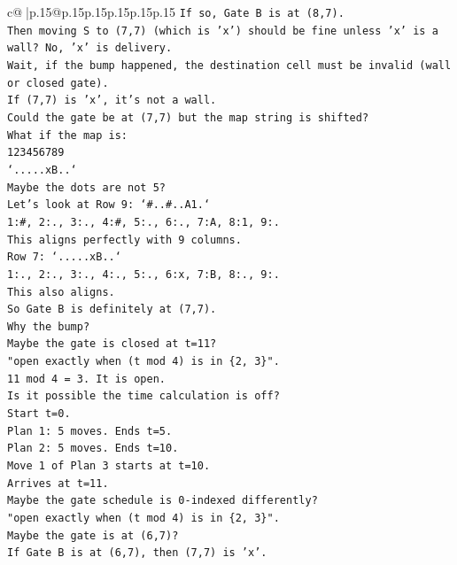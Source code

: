 \documentclass{article}
\begin{document}
{\begin{supertabular}{c@{$\;$}|p{.15\linewidth}@{}p{.15\linewidth}p{.15\linewidth}p{.15\linewidth}p{.15\linewidth}p{.15\linewidth}}
{{{\texttt{If so, Gate B is at (8,7).} \\
\texttt{Then moving S to (7,7) (which is 'x') should be fine unless 'x' is a wall? No, 'x' is delivery.} \\
\texttt{Wait, if the bump happened, the destination cell must be invalid (wall or closed gate).} \\
\texttt{If (7,7) is 'x', it's not a wall.} \\
\texttt{Could the gate be at (7,7) but the map string is shifted?} \\
\texttt{What if the map is:} \\
\texttt{123456789} \\
\texttt{`.....xB..`} \\
\texttt{Maybe the dots are not 5?} \\
\texttt{Let's look at Row 9: `\#..\#..A1.`} \\
\texttt{1:\#, 2:., 3:., 4:\#, 5:., 6:., 7:A, 8:1, 9:.} \\
\texttt{This aligns perfectly with 9 columns.} \\
\texttt{Row 7: `.....xB..`} \\
\texttt{1:., 2:., 3:., 4:., 5:., 6:x, 7:B, 8:., 9:.} \\
\texttt{This also aligns.} \\
\texttt{So Gate B is definitely at (7,7).} \\
\texttt{Why the bump?} \\
\texttt{Maybe the gate is closed at t=11?} \\
\texttt{"open exactly when (t mod 4) is in \{2, 3\}".} \\
\texttt{11 mod 4 = 3. It is open.} \\
\texttt{Is it possible the time calculation is off?} \\
\texttt{Start t=0.} \\
\texttt{Plan 1: 5 moves. Ends t=5.} \\
\texttt{Plan 2: 5 moves. Ends t=10.} \\
\texttt{Move 1 of Plan 3 starts at t=10.} \\
\texttt{Arrives at t=11.} \\
\texttt{Maybe the gate schedule is 0{-}indexed differently?} \\
\texttt{"open exactly when (t mod 4) is in \{2, 3\}".} \\
\texttt{Maybe the gate is at (6,7)?} \\
\texttt{If Gate B is at (6,7), then (7,7) is 'x'.} \\
}}}
\end{supertabular}}
\end{document}
